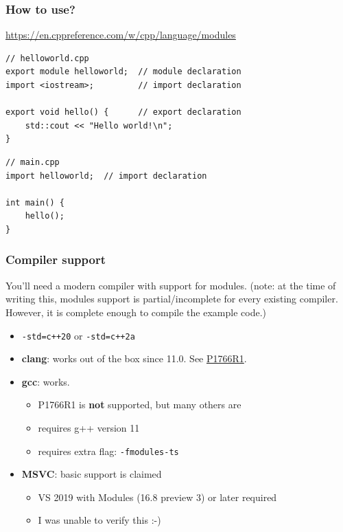 \documentclass[aspectratio=169]{beamer}
\begin{document}
\begin{frame}[fragile]
\frametitle{How to use?}
{\Large \href{https://en.cppreference.com/w/cpp/language/modules}
             {https://en.cppreference.com/w/cpp/language/modules}}
\vspace{1ex}
{\scriptsize
\begin{verbatim}
// helloworld.cpp
export module helloworld;  // module declaration
import <iostream>;         // import declaration

export void hello() {      // export declaration
    std::cout << "Hello world!\n";
}
\end{verbatim}

\begin{verbatim}
// main.cpp
import helloworld;  // import declaration

int main() {
    hello();
}
\end{verbatim}
}
\end{frame}


\begin{frame}
\frametitle{Compiler support}
{\Large You'll need a modern compiler with support for modules.} \linebreak{}
{\small (note: at the time of writing this, modules support is partial/incomplete for every existing compiler. However, it is complete enough to compile the example code.)}
\vspace{1ex}
\begin{itemize}
  \item{\texttt{-std=c++20} or \texttt{-std=c++2a}}
  \item{\textbf{clang}: works out of the box since 11.0. See
  \href{http://www.open-std.org/jtc1/sc22/wg21/docs/papers/2019/p1766r1.html}{P1766R1}.}
  \item{\textbf{gcc}: works.}
  \begin{itemize}
    \item{P1766R1 is \textbf{\textcolor{clRedFlag}{not}} supported, but many others are}
    \item{requires g++ version 11}
    \item{requires extra flag: \texttt{\textcolor{clFlag}{-fmodules-ts}}}
  \end{itemize}

  \item{\textbf{MSVC}: basic support is claimed}
  \begin{itemize}
    \item{VS 2019 with Modules (16.8 preview 3) or later required}
    \item{I was unable to verify this :-)}
  \end{itemize}

\end{itemize}
\end{frame}
\end{document}
